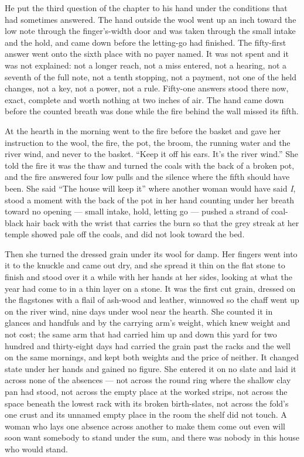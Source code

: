 He put the third question of the chapter to his hand under the conditions that had sometimes answered. The hand outside the wool went up an inch toward the low note through the finger's-width door and was taken through the small intake and the hold, and came down before the letting-go had finished. The fifty-first answer went onto the sixth place with no payer named. It was not spent and it was not explained: not a longer reach, not a miss entered, not a hearing, not a seventh of the full note, not a tenth stopping, not a payment, not one of the held changes, not a key, not a power, not a rule. Fifty-one answers stood there now, exact, complete and worth nothing at two inches of air. The hand came down before the counted breath was done while the fire behind the wall missed its fifth.

\scenebreak

At the hearth in the morning  went to the fire before the basket and gave her instruction to the wool, the fire, the pot, the broom, the running water and the river wind, and never to the basket. “Keep it off his ears. It's the river wind.” She told the fire it was the thaw and turned the coals with the back of a broken pot, and the fire answered four low pulls and the silence where the fifth should have been. She said “The house will keep it” where another woman would have said \emph{I}, stood a moment with the back of the pot in her hand counting under her breath toward no opening — small intake, hold, letting go — pushed a strand of coal-black hair back with the wrist that carries the burn so that the grey streak at her temple showed pale off the coals, and did not look toward the bed.

Then she turned the dressed grain under its wool for damp. Her fingers went into it to the knuckle and came out dry, and she spread it thin on the flat stone to finish and stood over it a while with her hands at her sides, looking at what the year had come to in a thin layer on a stone. It was the first cut grain, dressed on the flagstones with a flail of ash-wood and leather, winnowed so the chaff went up on the river wind, nine days under wool near the hearth. She counted it in glances and handfuls and by the carrying arm's weight, which knew weight and not cost; the same arm that had carried him up and down this yard for two hundred and thirty-eight days had carried the grain past the racks and the well on the same mornings, and kept both weights and the price of neither. It changed state under her hands and gained no figure. She entered it on no slate and laid it across none of the absences — not across the round ring where the shallow clay pan had stood, not across the empty place at the worked strips, not across the space beneath the lowest rack with its broken birth-slates, not across the fold's one crust and its unnamed empty place in the room the shelf did not touch. A woman who lays one absence across another to make them come out even will soon want somebody to stand under the sum, and there was nobody in this house who would stand.

